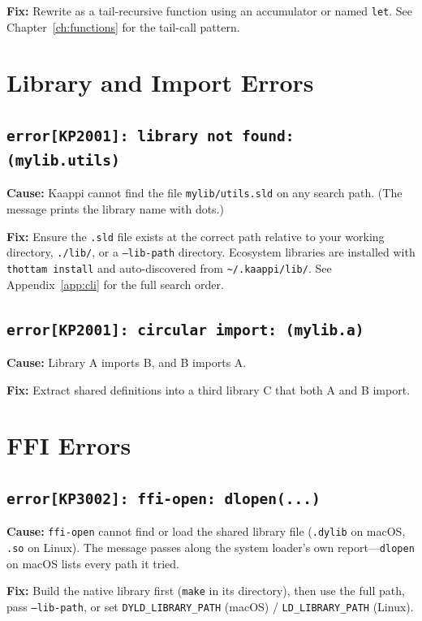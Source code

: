 \textbf{Fix:} Rewrite as a tail-recursive function using an accumulator or named \texttt{let}. See Chapter~\ref{ch:functions} for the tail-call pattern.

\section{Library and Import Errors}

\subsection{\texttt{error[KP2001]: library not found: (mylib.utils)}}

\textbf{Cause:} Kaappi cannot find the file \texttt{mylib/utils.sld} on any search path. (The message prints the library name with dots.)

\textbf{Fix:} Ensure the \texttt{.sld} file exists at the correct path relative to your working directory, \texttt{./lib/}, or a \texttt{--lib-path} directory. Ecosystem libraries are installed with \texttt{thottam install} and auto-discovered from \texttt{\textasciitilde/.kaappi/lib/}. See Appendix~\ref{app:cli} for the full search order.

\subsection{\texttt{error[KP2001]: circular import: (mylib.a)}}

\textbf{Cause:} Library A imports B, and B imports A.

\textbf{Fix:} Extract shared definitions into a third library C that both A and B import.

\section{FFI Errors}

\subsection{\texttt{error[KP3002]: ffi-open: dlopen(...)}}

\textbf{Cause:} \texttt{ffi-open} cannot find or load the shared library file (\texttt{.dylib} on macOS, \texttt{.so} on Linux). The message passes along the system loader's own report---\texttt{dlopen} on macOS lists every path it tried.

\textbf{Fix:} Build the native library first (\texttt{make} in its directory), then use the full path, pass \texttt{--lib-path}, or set \texttt{DYLD\_LIBRARY\_PATH} (macOS) / \texttt{LD\_LIBRARY\_PATH} (Linux).

